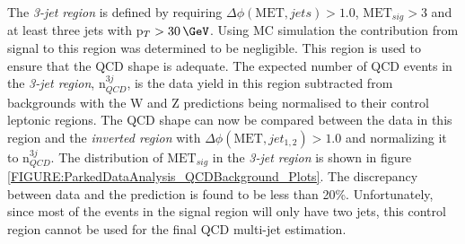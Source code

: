The \textit{3-jet region} is defined by requiring $\Delta\phi(\text{MET},jets)>1.0$, $\text{MET}_{sig}>3$ and at least three jets with p$_{T}>30\,\GeV$. Using \gls{MC} simulation the contribution from signal to this region was determined to be negligible. This region is used to ensure that the \gls{QCD} shape is adequate. The expected number of \gls{QCD} events in the \textit{3-jet region}, n$_{QCD}^{3j}$, is the data yield in this region subtracted from backgrounds with the W and Z predictions being normalised to their control leptonic regions. The \gls{QCD} shape can now be compared between the data in this region and the \textit{inverted region} with $\Delta\phi(\text{MET},jet_{1,2})>1.0$ and normalizing it to n$_{QCD}^{3j}$. The distribution of $\text{MET}_{sig}$ in the \textit{3-jet region} is shown in figure \ref{FIGURE:ParkedDataAnalysis_QCDBackground_Plots}. The discrepancy between data and the prediction is found to be less than 20\%. Unfortunately, since most of the events in the signal region will only have two jets, this control region cannot be used for the final \gls{QCD} multi-jet estimation.


